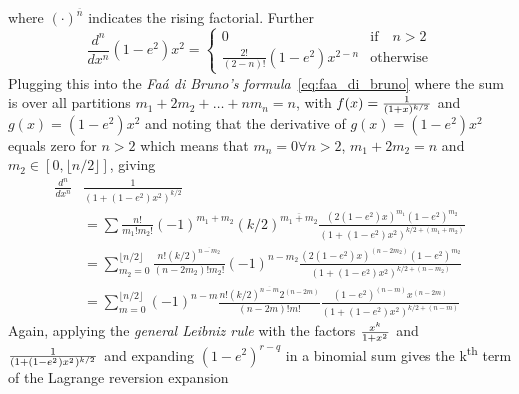 \documentclass[a4paper]{amsart}
\begin{document}
where $(\cdot)^{\overline{n}}$ indicates the rising factorial. Further
\begin{equation*}
\frac{d^n}{dx^n}(1-e^2)x^2 =
\begin{cases}
0 & \text{if}\quad n > 2 \\
\frac{2!}{(2-n)!}(1-e^2)x^{2-n} &  \text{otherwise}
\end{cases}
\end{equation*}
Plugging this into the \emph{Fa\'{a} di Bruno's formula}~\eqref{eq:faa_di_bruno} where the sum is over all partitions $m_1+2m_2+\dots+nm_n = n$, with $f(x)=\frac{1}{\smash{(1+x)^{{}_{k/2}}}}$ and $g(x)=(1-e^2)x^2$ and noting that the derivative of $g(x)=(1-e^2)x^2$ equals zero for $n>2$ which means that $m_n=0\forall n>2$, $m_1+2m_2=n$ and $m_2\in[0,\lfloor n/2\rfloor]$, giving
\begin{align*}
\frac{d^n}{dx^n}&\frac{1}{(1+(1-e^2)x^2)^{k/2}}\\
&=\sum\frac{n!}{m_1!m_2!} (-1)^{m_1+m_2}(k/2)^{\overline{m_1+m_2}}\frac{(2(1-e^2)x)^{m_1}(1-e^2)^{m_2}}{(1+(1-e^2)x^2)^{k/2+(m_1+m_2)}}\\
&=\sum_{m_2=0}^{\lfloor n/2\rfloor}\frac{n!(k/2)^{\overline{n-m_2}}}{(n-2m_2)!m_2!} (-1)^{n-m_2}\frac{(2(1-e^2)x)^{(n-2m_2)}(1-e^2)^{m_2}}{(1+(1-e^2)x^2)^{k/2+(n-m_2)}}\\
&=\sum_{m=0}^{\lfloor n/2\rfloor}(-1)^{n-m}\frac{n!(k/2)^{\overline{n-m}}2^{(n-2m)}}{(n-2m)!m!}\frac{(1-e^2)^{(n-m)}x^{(n-2m)}}{(1+(1-e^2)x^2)^{k/2+(n-m)}}
\end{align*}
%
Again, applying the \emph{general Leibniz rule} with the factors $\frac{\smash{x^k}}{\smash{1+x^{{}_2}}}$ and $\frac{1}{\smash{(1 + (1-e^{{}_2})x^{{}_2})^{{}_{k/2}}}}$ and expanding $(1-e^2)^{r-q}$ in a binomial sum gives the k\textsuperscript{th} term of the Lagrange reversion expansion
\end{document}

